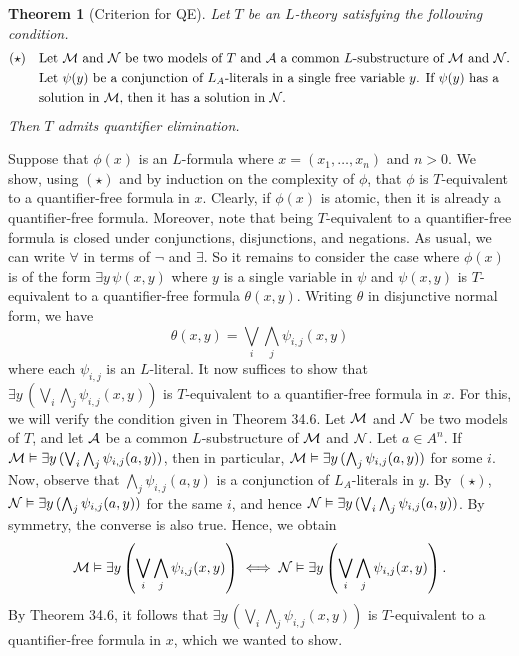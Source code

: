 \documentclass[10pt]{article}
\makeatletter
\theoremstyle{newstyle}
\newtheorem{thm}{Theorem}[section]
\newenvironment{pf}[1][\proofname]{\par
  \pushQED{\qed}%
  \normalfont \topsep0\p@\relax
  \trivlist
  \item[\hskip\labelsep\scshape
  #1\@addpunct{.}]\ignorespaces
}{%
  \popQED\endtrivlist\@endpefalse
}
\makeatother
\begin{document}
\begin{thm}[Criterion for QE]
Let $T$ be an $L$-theory satisfying the following condition. 
\begin{align*}
    (\star) \quad & \text{Let ${\cal M}$ and ${\cal N}$ be two models of $T$ and ${\cal A}$
    a common $L$-substructure of ${\cal M}$ and ${\cal N}$.} \\
    & \text{Let $\psi(y)$ be a 
    conjunction of $L_A$-literals in a single free variable $y$. If $\psi(y)$ has a} \\
    & \text{solution in ${\cal M}$, then it has a solution in ${\cal N}$.}
\end{align*}
Then $T$ admits quantifier elimination.
\end{thm}
\begin{pf}
Suppose that $\phi(x)$ is an $L$-formula where $x = (x_1, \dots, x_n)$ and $n > 0$. 
We show, using $(\star)$ and by induction on the complexity of $\phi$, that $\phi$ is 
$T$-equivalent to a quantifier-free formula in $x$. Clearly, if $\phi(x)$ is atomic, then 
it is already a quantifier-free formula. Moreover, note that being $T$-equivalent to 
a quantifier-free formula is closed under conjunctions, disjunctions, and negations. 
As usual, we can write $\forall$ in terms of $\neg$ and $\exists$. So it remains to consider the 
case where $\phi(x)$ is of the form $\exists y \, \psi(x, y)$ where $y$ is a single variable in $\psi$
and $\psi(x, y)$ is $T$-equivalent to a quantifier-free formula $\theta(x, y)$. Writing 
$\theta$ in disjunctive normal form, we have 
\[ \theta(x, y) = \bigvee_i \bigwedge_j \psi_{i,j}(x, y) \] 
where each $\psi_{i,j}$ is an $L$-literal. It now suffices to show that 
$\exists y \, (\bigvee_i \bigwedge_j \psi_{i,j}(x, y))$ is $T$-equivalent to 
a quantifier-free formula in $x$. For this, we will verify the condition given in Theorem 34.6.
Let ${\cal M}$ and ${\cal N}$ be two models of $T$, and let ${\cal A}$ be a common 
$L$-substructure of ${\cal M}$ and ${\cal N}$. Let $a \in A^n$. If 
${\cal M} \vDash \exists y \, (\bigvee_i \bigwedge_j \psi_{i,j}(a, y))$, then in particular, 
${\cal M} \vDash \exists y \, (\bigwedge_j \psi_{i,j}(a, y))$ for some $i$. 
Now, observe that $\bigwedge_j \psi_{i,j}(a, y)$ is a conjunction of $L_A$-literals in $y$. 
By $(\star)$, ${\cal N} \vDash \exists y \, (\bigwedge_j \psi_{i,j}(a, y))$ for the same 
$i$, and hence ${\cal N} \vDash \exists y \, (\bigvee_i \bigwedge_j \psi_{i,j}(a, y))$. 
By symmetry, the converse is also true. Hence, we obtain 
\[ {\cal M} \vDash \exists y \left( \bigvee_i \bigwedge_j \psi_{i,j}(x, y) \right) 
\iff {\cal N} \vDash \exists y \left( \bigvee_i \bigwedge_j \psi_{i,j}(x, y) \right). \]
By Theorem 34.6, it follows that $\exists y \, (\bigvee_i \bigwedge_j \psi_{i,j}(x, y))$ 
is $T$-equivalent to a quantifier-free formula in $x$, which we wanted to show.
\end{pf}
\end{document}
